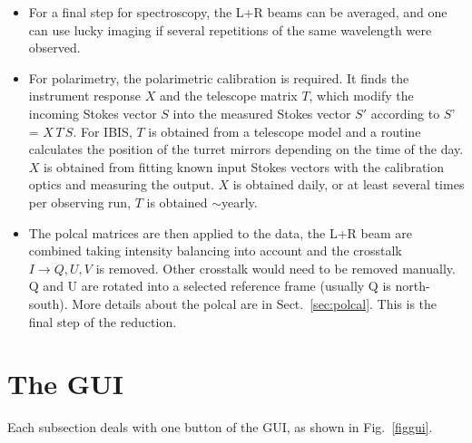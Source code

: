 \documentclass[a4paper,11pt]{article}
\begin{document}
\begin{itemize}
 \item For a final step for spectroscopy, the L+R beams can be averaged, and one can use lucky imaging if several repetitions of the same wavelength were observed.
 
 \item For polarimetry, the polarimetric calibration is required. It finds the instrument response $X$ and the telescope matrix $T$, which modify the incoming Stokes vector $S$ into the measured Stokes vector $S'$ according to $S$' = $X\, T\, S$. For IBIS, $T$ is obtained from a telescope model and a routine calculates the position of the turret mirrors depending on the time of the day. $X$ is obtained from fitting known input Stokes vectors with the calibration optics and measuring the output. $X$ is obtained daily, or at least several times per observing run, $T$ is obtained $\sim$yearly.
 
 \item The polcal matrices are then applied to the data, the L+R beam are combined taking intensity balancing into account and the crosstalk $I\rightarrow Q,U,V$ is removed. Other crosstalk would need to be removed manually. Q and U are rotated into a selected reference frame (usually Q is north-south). More details about the polcal are in Sect.~\ref{sec:polcal}. This is the final step of the reduction.
 
\end{itemize}


\newpage
\section{The GUI}
\label{sec:gui}
Each subsection deals with one button of the GUI, as shown in Fig.~\ref{figgui}.
\end{document}
